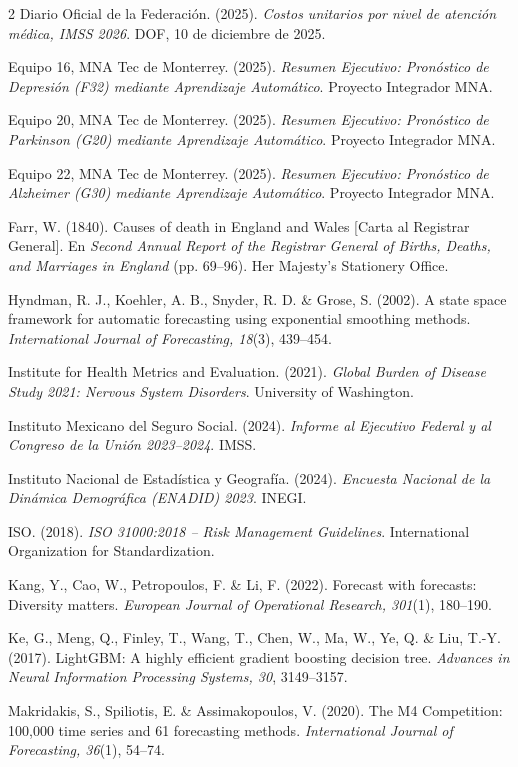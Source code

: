 \documentclass[12pt, letterpaper]{article}
\begin{document}
\begin{multicols}{2}
Diario Oficial de la Federación. (2025). \textit{Costos unitarios por nivel de atención médica, IMSS 2026}. DOF, 10 de diciembre de 2025.

Equipo 16, MNA Tec de Monterrey. (2025). \textit{Resumen Ejecutivo: Pronóstico de Depresión (F32) mediante Aprendizaje Automático}. Proyecto Integrador MNA.

Equipo 20, MNA Tec de Monterrey. (2025). \textit{Resumen Ejecutivo: Pronóstico de Parkinson (G20) mediante Aprendizaje Automático}. Proyecto Integrador MNA.

Equipo 22, MNA Tec de Monterrey. (2025). \textit{Resumen Ejecutivo: Pronóstico de Alzheimer (G30) mediante Aprendizaje Automático}. Proyecto Integrador MNA.

Farr, W. (1840). Causes of death in England and Wales [Carta al Registrar General]. En \textit{Second Annual Report of the Registrar General of Births, Deaths, and Marriages in England} (pp. 69--96). Her Majesty's Stationery Office.

Hyndman, R. J., Koehler, A. B., Snyder, R. D. \& Grose, S. (2002). A state space framework for automatic forecasting using exponential smoothing methods. \textit{International Journal of Forecasting, 18}(3), 439--454.

Institute for Health Metrics and Evaluation. (2021). \textit{Global Burden of Disease Study 2021: Nervous System Disorders}. University of Washington.

Instituto Mexicano del Seguro Social. (2024). \textit{Informe al Ejecutivo Federal y al Congreso de la Unión 2023--2024}. IMSS.

Instituto Nacional de Estadística y Geografía. (2024). \textit{Encuesta Nacional de la Dinámica Demográfica (ENADID) 2023}. INEGI.

ISO. (2018). \textit{ISO 31000:2018 -- Risk Management Guidelines}. International Organization for Standardization.

Kang, Y., Cao, W., Petropoulos, F. \& Li, F. (2022). Forecast with forecasts: Diversity matters. \textit{European Journal of Operational Research, 301}(1), 180--190.

Ke, G., Meng, Q., Finley, T., Wang, T., Chen, W., Ma, W., Ye, Q. \& Liu, T.-Y. (2017). LightGBM: A highly efficient gradient boosting decision tree. \textit{Advances in Neural Information Processing Systems, 30}, 3149--3157.

Makridakis, S., Spiliotis, E. \& Assimakopoulos, V. (2020). The M4 Competition: 100,000 time series and 61 forecasting methods. \textit{International Journal of Forecasting, 36}(1), 54--74.


\end{multicols}
\end{document}
